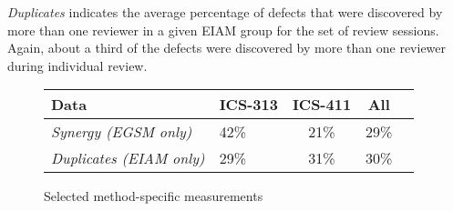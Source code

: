 {\em Duplicates} indicates the average percentage of defects that were
discovered by more than one reviewer in a given EIAM group for the set of
review sessions. Again, about a third of the defects were discovered by 
more than one reviewer during individual review. 

\begin{figure}[ht]
\small
  \begin{center}
  \begin{tabular}{|l|l|c|c|c|}
   \hline
Data                       & ICS-313 & ICS-411 & All \\
   \hline
{\em Synergy (EGSM only)}         & 42\%    & 21\%     & 29\% \\
{\em Duplicates (EIAM only)}      & 29\%    & 31\%     & 30\% \\
  \hline
   \end{tabular}
  \end{center}
 \caption{Selected method-specific measurements}
 \label{fig:individual-results}
\normalsize
\end{figure}


